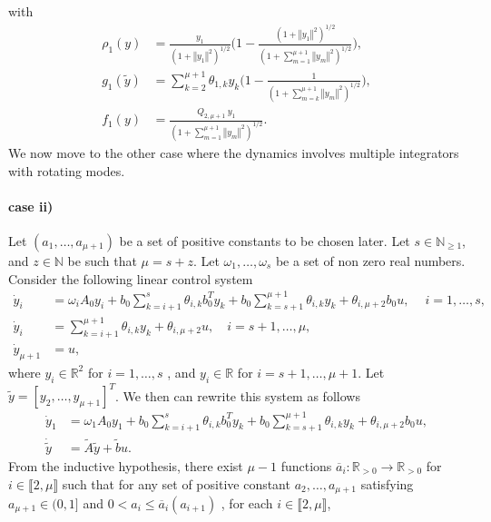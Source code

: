 \documentclass[letterpaper, 10pt]{article}
\newcommand{\norme}[1]{\left\Vert #1\right\Vert}
\newcommand{\reels}{\mathbb{R}}
\newcommand{\entiers}{\mathbb{N}}
\begin{document}
 with
\begin{align}
\label{def:ro1:cii}
\rho_1(y) &=  \frac{y_1}{(1 + \norme{y_1}^2 )^{1/2}} \big(1 -  \frac{( 1 + \norme{y_1}^2 )^{1/2}}{ (1 + \sum\limits_{m=1}^{ \mu +1} \norme{y_m}^2 )^{1/2}} \big) , \\ \label{def:g1:cii}
g_1(\tilde{y})& = \sum_{k=2}^{\mu +1} \theta_{1,k} y_k \big( 1 - \frac{1 }{ (1 + \sum\limits_{m=k}^{\mu +1} \norme{y_m}^2 )^{1/2}} \big), \\ \label{def:f1:cii}
f_1(y) & =  \frac{  Q_{2,\mu +1} \: y_1 }{(1 + \sum\limits_{m=1}^{\mu +1} \norme{y_m}^2 )^{1/2}}.
\end{align}
We now move to the other case where the dynamics involves multiple integrators with rotating modes.
\paragraph{case ii)} Let $(a_1 , \ldots , a_{\mu + 1})$ be a set of positive constants to be chosen later. Let $ s \in \entiers_{\geq 1}$, and $ z \in \entiers$ be such that $\mu = s+z$. Let $\omega_1, \ldots , \omega_s$ be a set of non zero real numbers. Consider the following linear control system
\begin{align*}
\dot{y}_i &= \omega_i A_0 y_i + b_0 \sum_{k=i+1}^{s} \theta_{i,k} b_0^T y_k + b_0 \sum_{k=s+1}^{\mu +1 } \theta_{i,k} y_k + \theta_{i,\mu +2 }  b_0 u ,\: \quad i=1, \ldots , s, \nonumber  \\
\dot{y}_i &= \sum_{k=i+1}^{\mu + 1 } \theta_{i,k} y_k + \theta_{i,\mu +2 } u, \quad i=s+1 , \ldots , \mu,  \\
\dot{y}_{\mu +1 }&= u, \nonumber
\end{align*} where $y_i \in \reels^2 $ for $i=1, \ldots , s$ , and $y_i \in \reels$ for $i=s+1 , \ldots , \mu+1$.  Let $\tilde{y}=[ y_2 , \ldots , y_{\mu +1 }]^T$. We then can rewrite this system as follows 
\begin{align*}
\dot{y}_1 &= \omega_1 A_0 y_1 + b_0 \sum_{k=i+1}^{s} \theta_{i,k} b_0^T y_k + b_0 \sum_{k=s+1}^{\mu +1 } \theta_{i,k} y_k + \theta_{i,\mu +2 }  b_0 u ,   \\
\dot{\tilde{y}} &=  \tilde{A} \tilde{y} + \tilde{b} u. \nonumber
\end{align*} From the inductive hypothesis, there exist $\mu-1$ functions $\overline{a}_i :\reels_{>0} \rightarrow \reels_{>0}$ for $i \in \llbracket 2 ,\mu  \rrbracket$  such that for any set of positive constant $a_2 , \ldots , a_{\mu +1 } $ satisfying $a_{\mu +1 } \in (0,1]$ and  $0  <  a_i \leq  \overline{a}_i (a_{i +1})$ , for each $ i  \in \llbracket 2 ,\mu \rrbracket$,
\end{document}
